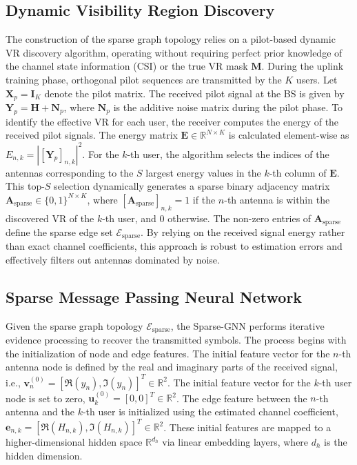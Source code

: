 \subsection{Dynamic Visibility Region Discovery}
The construction of the sparse graph topology relies on a pilot-based dynamic VR discovery algorithm, operating without requiring perfect prior knowledge of the channel state information (CSI) or the true VR mask $\mathbf{M}$. During the uplink training phase, orthogonal pilot sequences are transmitted by the $K$ users. Let $\mathbf{X}_p = \mathbf{I}_K$ denote the pilot matrix. The received pilot signal at the BS is given by $\mathbf{Y}_p = \mathbf{H} + \mathbf{N}_p$, where $\mathbf{N}_p$ is the additive noise matrix during the pilot phase. To identify the effective VR for each user, the receiver computes the energy of the received pilot signals. The energy matrix $\mathbf{E} \in \mathbb{R}^{N \times K}$ is calculated element-wise as $E_{n,k} = |[\mathbf{Y}_p]_{n,k}|^2$. For the $k$-th user, the algorithm selects the indices of the antennas corresponding to the $S$ largest energy values in the $k$-th column of $\mathbf{E}$. This top-$S$ selection dynamically generates a sparse binary adjacency matrix $\mathbf{A}_{\text{sparse}} \in \{0, 1\}^{N \times K}$, where $[\mathbf{A}_{\text{sparse}}]_{n,k} = 1$ if the $n$-th antenna is within the discovered VR of the $k$-th user, and $0$ otherwise. The non-zero entries of $\mathbf{A}_{\text{sparse}}$ define the sparse edge set $\mathcal{E}_{\text{sparse}}$. By relying on the received signal energy rather than exact channel coefficients, this approach is robust to estimation errors and effectively filters out antennas dominated by noise.

\subsection{Sparse Message Passing Neural Network}
Given the sparse graph topology $\mathcal{E}_{\text{sparse}}$, the Sparse-GNN performs iterative evidence processing to recover the transmitted symbols. The process begins with the initialization of node and edge features. The initial feature vector for the $n$-th antenna node is defined by the real and imaginary parts of the received signal, i.e., $\mathbf{v}_n^{(0)} = [\Re(y_n), \Im(y_n)]^T \in \mathbb{R}^2$. The initial feature vector for the $k$-th user node is set to zero, $\mathbf{u}_k^{(0)} = [0, 0]^T \in \mathbb{R}^2$. The edge feature between the $n$-th antenna and the $k$-th user is initialized using the estimated channel coefficient, $\mathbf{e}_{n,k} = [\Re(H_{n,k}), \Im(H_{n,k})]^T \in \mathbb{R}^2$. These initial features are mapped to a higher-dimensional hidden space $\mathbb{R}^{d_h}$ via linear embedding layers, where $d_h$ is the hidden dimension.

